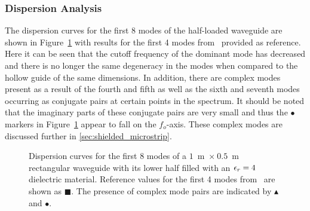 \subsubsection{Dispersion Analysis}

The dispersion curves for the first 8 modes of the half-loaded
waveguide are shown in
Figure~\ref{fig:half_loaded_rectangular_dispersion_curves} with
results for the first 4 modes from~\cite{Jin2002} provided as
reference. Here it can be seen that the cutoff frequency of the
dominant mode has decreased and there is no longer the same degeneracy
in the modes when compared to the hollow guide of the same
dimensions. In addition, there are complex modes present as a result
of the fourth and fifth as well as the sixth and seventh modes
occurring as conjugate pairs at certain points in the spectrum. It
should be noted that the imaginary parts of these conjugate pairs are
very small and thus the $\bullet$ markers in
Figure~\ref{fig:half_loaded_rectangular_dispersion_curves} appear to
fall on the $f_o$-axis.  These complex modes are discussed further in
\ref{sec:shielded_microstrip}.
\begin{figure}
 \centering
 \caption{Dispersion curves for the first 8 modes of a $1$~m~$\times~0.5$~m rectangular waveguide with its lower half filled with an $\epsilon_r = 4$ dielectric material.  Reference values for the first 4 modes from~\cite{Jin2002} are shown as $\blacksquare$.  The presence of complex mode pairs are indicated by $\blacktriangle$ and $\bullet$.}
 \label{fig:half_loaded_rectangular_dispersion_curves}
\end{figure}
